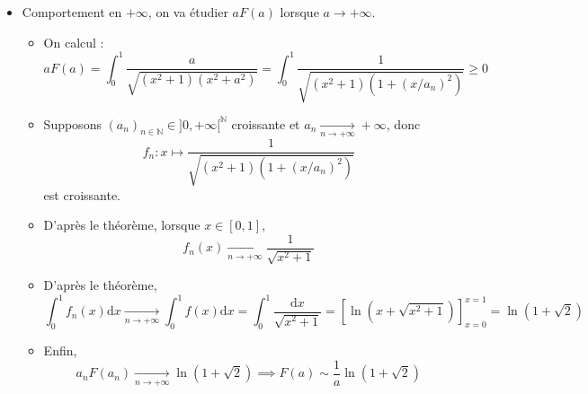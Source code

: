 \begin{myproof}{}{}
\begin{itemize}
\begin{itemize}
  \end{itemize}

\item Comportement en $+ \infty$, on va étudier $aF(a)$ lorsque $a \to + \infty$. 
  \begin{itemize}

      \item On calcul : 
        \begin{equation}
          aF(a) = \int_{0}^{1} \frac{a}{\sqrt{(x ^{2}+1)(x ^{2}+a ^{2})}}  = \int_{0}^{1} \frac{1}{\sqrt{(x ^{2}+1)\left( 1+ \left( x/ a_n  \right) ^{2}\right)}}  \ge 0
        \end{equation}

      \item Supposons $(a_n) _{n\in \mathbb{N}} \in ]0,+ \infty[ ^{\mathbb{N}}$ croissante et $a_n  \underset{n \to + \infty}{\longrightarrow} + \infty$, donc 
        \begin{equation}
          f_n : x \mapsto \frac{1}{\sqrt{(x ^{2}+1 ) (1 +(x/a_n) ^{2})}} 
        \end{equation}
        est croissante.

      \item D'après le théorème, lorsque $x \in [0,1]$, 
        \begin{equation} 
          f_n(x)  \underset{n \to + \infty}{\longrightarrow} \frac{1}{\sqrt{x ^{2}+1}} 
        \end{equation}

      \item D'après le théorème, 
        \begin{equation}
          \int_{0}^{1} f_n (x) \mathrm{d}x  \underset{n \to + \infty}{\longrightarrow} \int_{0}^{1}f(x) \mathrm{d}x = \int_{0}^{1} \frac{\mathrm{d}x}{\sqrt{x ^{2}+1}} = \left[ \ln (x+ \sqrt{x ^{2}+1}) \right] _{x =0} ^{x = 1} = \ln ( 1+ \sqrt{2})
        \end{equation}

      \item Enfin, 
        \begin{equation}
          a_nF(a_n)  \underset{n \to + \infty}{\longrightarrow} \ln(1+ \sqrt{2}) \implies F(a) \sim \frac{1}{a}  \ln (1 + \sqrt{2})
        \end{equation}

  \end{itemize}

\end{itemize}
\end{myproof}


